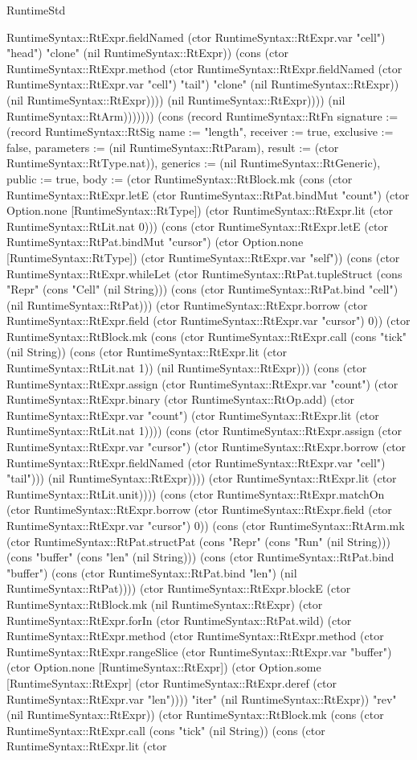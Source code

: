 \begin{lexlean}{RuntimeStd}
\begin{semanticmodule}
{RuntimeSyntax::RtExpr.fieldNamed (ctor RuntimeSyntax::RtExpr.var "cell") "head") "clone" (nil RuntimeSyntax::RtExpr)) (cons (ctor RuntimeSyntax::RtExpr.method (ctor RuntimeSyntax::RtExpr.fieldNamed (ctor RuntimeSyntax::RtExpr.var "cell") "tail") "clone" (nil RuntimeSyntax::RtExpr)) (nil RuntimeSyntax::RtExpr)))) (nil RuntimeSyntax::RtExpr)))) (nil RuntimeSyntax::RtArm))))))}) (cons (record RuntimeSyntax::RtFn {signature := (record RuntimeSyntax::RtSig {name := "length", receiver := true, exclusive := false, parameters := (nil RuntimeSyntax::RtParam), result := (ctor RuntimeSyntax::RtType.nat)}), generics := (nil RuntimeSyntax::RtGeneric), public := true, body := (ctor RuntimeSyntax::RtBlock.mk (cons (ctor RuntimeSyntax::RtExpr.letE (ctor RuntimeSyntax::RtPat.bindMut "count") (ctor Option.none [RuntimeSyntax::RtType]) (ctor RuntimeSyntax::RtExpr.lit (ctor RuntimeSyntax::RtLit.nat 0))) (cons (ctor RuntimeSyntax::RtExpr.letE (ctor RuntimeSyntax::RtPat.bindMut "cursor") (ctor Option.none [RuntimeSyntax::RtType]) (ctor RuntimeSyntax::RtExpr.var "self")) (cons (ctor RuntimeSyntax::RtExpr.whileLet (ctor RuntimeSyntax::RtPat.tupleStruct (cons "Repr" (cons "Cell" (nil String))) (cons (ctor RuntimeSyntax::RtPat.bind "cell") (nil RuntimeSyntax::RtPat))) (ctor RuntimeSyntax::RtExpr.borrow (ctor RuntimeSyntax::RtExpr.field (ctor RuntimeSyntax::RtExpr.var "cursor") 0)) (ctor RuntimeSyntax::RtBlock.mk (cons (ctor RuntimeSyntax::RtExpr.call (cons "tick" (nil String)) (cons (ctor RuntimeSyntax::RtExpr.lit (ctor RuntimeSyntax::RtLit.nat 1)) (nil RuntimeSyntax::RtExpr))) (cons (ctor RuntimeSyntax::RtExpr.assign (ctor RuntimeSyntax::RtExpr.var "count") (ctor RuntimeSyntax::RtExpr.binary (ctor RuntimeSyntax::RtOp.add) (ctor RuntimeSyntax::RtExpr.var "count") (ctor RuntimeSyntax::RtExpr.lit (ctor RuntimeSyntax::RtLit.nat 1)))) (cons (ctor RuntimeSyntax::RtExpr.assign (ctor RuntimeSyntax::RtExpr.var "cursor") (ctor RuntimeSyntax::RtExpr.borrow (ctor RuntimeSyntax::RtExpr.fieldNamed (ctor RuntimeSyntax::RtExpr.var "cell") "tail"))) (nil RuntimeSyntax::RtExpr)))) (ctor RuntimeSyntax::RtExpr.lit (ctor RuntimeSyntax::RtLit.unit)))) (cons (ctor RuntimeSyntax::RtExpr.matchOn (ctor RuntimeSyntax::RtExpr.borrow (ctor RuntimeSyntax::RtExpr.field (ctor RuntimeSyntax::RtExpr.var "cursor") 0)) (cons (ctor RuntimeSyntax::RtArm.mk (ctor RuntimeSyntax::RtPat.structPat (cons "Repr" (cons "Run" (nil String))) (cons "buffer" (cons "len" (nil String))) (cons (ctor RuntimeSyntax::RtPat.bind "buffer") (cons (ctor RuntimeSyntax::RtPat.bind "len") (nil RuntimeSyntax::RtPat)))) (ctor RuntimeSyntax::RtExpr.blockE (ctor RuntimeSyntax::RtBlock.mk (nil RuntimeSyntax::RtExpr) (ctor RuntimeSyntax::RtExpr.forIn (ctor RuntimeSyntax::RtPat.wild) (ctor RuntimeSyntax::RtExpr.method (ctor RuntimeSyntax::RtExpr.method (ctor RuntimeSyntax::RtExpr.rangeSlice (ctor RuntimeSyntax::RtExpr.var "buffer") (ctor Option.none [RuntimeSyntax::RtExpr]) (ctor Option.some [RuntimeSyntax::RtExpr] (ctor RuntimeSyntax::RtExpr.deref (ctor RuntimeSyntax::RtExpr.var "len")))) "iter" (nil RuntimeSyntax::RtExpr)) "rev" (nil RuntimeSyntax::RtExpr)) (ctor RuntimeSyntax::RtBlock.mk (cons (ctor RuntimeSyntax::RtExpr.call (cons "tick" (nil String)) (cons (ctor RuntimeSyntax::RtExpr.lit (ctor }
\end{semanticmodule}
\end{lexlean}
